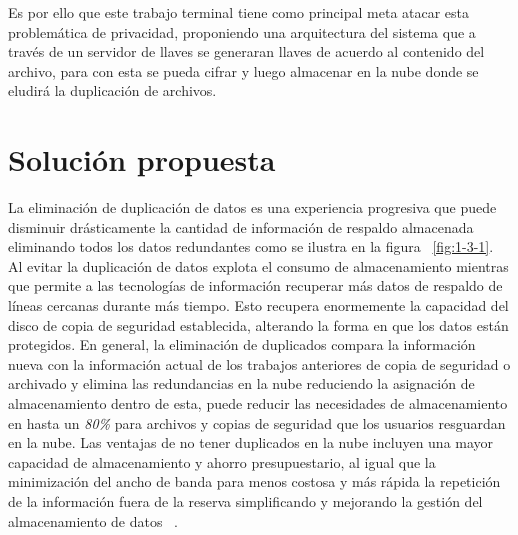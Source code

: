 Es por ello que este trabajo terminal tiene como principal meta atacar esta problemática de privacidad, proponiendo una arquitectura del sistema que a través de un servidor de llaves se generaran llaves de acuerdo al contenido del archivo, para con esta se pueda cifrar y luego almacenar en la nube donde se eludirá la duplicación de archivos. 



\section{Solución propuesta}
La eliminación de duplicación de datos es una experiencia progresiva que puede disminuir drásticamente la cantidad de información de respaldo almacenada eliminando todos los datos redundantes como se ilustra en la figura ~\ref{fig:1-3-1}. Al evitar la duplicación de datos explota el consumo de almacenamiento mientras que permite a las tecnologías de información recuperar más datos de respaldo de líneas cercanas durante más tiempo. Esto recupera enormemente la capacidad del disco de copia de seguridad establecida, alterando la forma en que los datos están protegidos. En general,
la eliminación de duplicados compara la información nueva con la información actual de los trabajos anteriores de copia de seguridad o archivado y elimina las redundancias en la nube reduciendo la asignación de almacenamiento dentro de esta, puede reducir las necesidades de almacenamiento en hasta un \textit{80\%} para archivos y copias de seguridad que los usuarios resguardan en la nube. Las ventajas de no tener duplicados en la nube incluyen una mayor capacidad de almacenamiento y ahorro presupuestario, al igual que la minimización del ancho de banda para menos costosa y más rápida la repetición de la información fuera de la reserva simplificando y mejorando la gestión del almacenamiento de datos  ~\cite{rededup}. 


